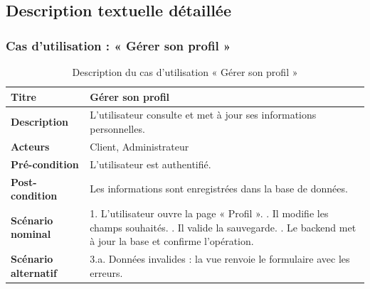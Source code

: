 \subsection{Description textuelle détaillée}

\subsubsection{Cas d'utilisation : « Gérer son profil »}
\begin{table}[h!]
\centering
\renewcommand{\arraystretch}{1.3}
\begin{tabularx}{\textwidth}{|l|X|}
\hline
\textbf{Titre} & Gérer son profil \\ \hline
\textbf{Description} & L'utilisateur consulte et met à jour ses informations
personnelles. \\ \hline
\textbf{Acteurs} & Client, Administrateur \\ \hline
\textbf{Pré-condition} & L'utilisateur est authentifié. \\ \hline
\textbf{Post-condition} & Les informations sont enregistrées dans la base de données. \\ \hline
\textbf{Scénario nominal} &
1. L'utilisateur ouvre la page « Profil ». \newline
2. Il modifie les champs souhaités. \newline
3. Il valide la sauvegarde. \newline
4. Le backend met à jour la base et confirme l'opération. \\ \hline
\textbf{Scénario alternatif} &
3.a. Données invalides : la vue renvoie le formulaire avec les erreurs. \\ \hline
\end{tabularx}
\caption{Description du cas d'utilisation « Gérer son profil »}
\end{table}

